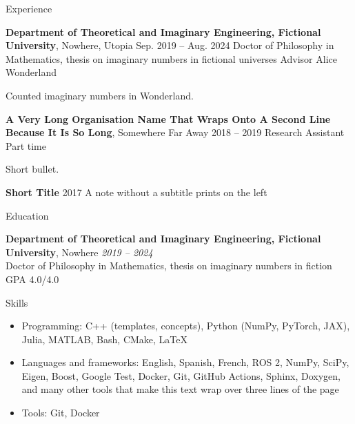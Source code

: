\documentclass{resume}
\begin{document}
    \begin{rSection}{Experience}
    
    \begin{rSubsection}
    {\textbf{Department of Theoretical and Imaginary Engineering, Fictional University}, Nowhere, Utopia}
    { Sep. 2019 -- Aug. 2024 }
    { Doctor of Philosophy in Mathematics, thesis on imaginary numbers in fictional universes }
    {Advisor Alice Wonderland}
    {}\item Counted imaginary numbers in Wonderland.
    \end{rSubsection}
    
    \begin{rSubsection}
    {\textbf{A Very Long Organisation Name That Wraps Onto A Second Line Because It Is So Long}, Somewhere Far Away}
    { 2018 -- 2019 }
    { Research Assistant }
    {Part time}
    {}\item Short bullet.
    \end{rSubsection}
    
    \begin{rSubsection}
    {\textbf{Short Title}}
    { 2017 }
    {  }
    {A note without a subtitle prints on the left}
    {} 
        \item[]\vspace{-2em}\end{rSubsection}
    
    \end{rSection}

    

    \begin{rSection}{Education}
    
    {\textbf{Department of Theoretical and Imaginary Engineering, Fictional University}, Nowhere} \hfill {\em 2019 -- 2024} 
    \\ Doctor of Philosophy in Mathematics, thesis on imaginary numbers in fiction \hfill GPA 4.0/4.0\medskip
    
    \end{rSection}

    \begin{rSection}{Skills}
    \begin{itemize}[leftmargin=0em, label={}, noitemsep]
    
    \item {Programming:} \hfill {C++ (templates, concepts), Python (NumPy, PyTorch, JAX), Julia, MATLAB, Bash, CMake, LaTeX}
    \item {Languages and frameworks:} \hfill {English, Spanish, French, ROS 2, NumPy, SciPy, Eigen, Boost, Google Test, Docker, Git, GitHub Actions, Sphinx, Doxygen, and many other tools that make this text wrap over three lines of the page}
    \item {Tools:} \hfill {Git, Docker}
    \end{itemize}
    \end{rSection}
\end{document}
